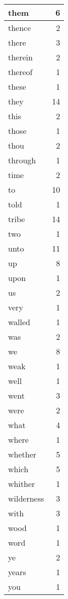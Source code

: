 \begin{center}
\begin{longtable}{l|r}
them & 6\\ \hline 
thence & 2\\ \hline 
there & 3\\ \hline 
therein & 2\\ \hline 
thereof & 1\\ \hline 
these & 1\\ \hline 
they & 14\\ \hline 
this & 2\\ \hline 
those & 1\\ \hline 
thou & 2\\ \hline 
through & 1\\ \hline 
time & 2\\ \hline 
to & 10\\ \hline 
told & 1\\ \hline 
tribe & 14\\ \hline 
two & 1\\ \hline 
unto & 11\\ \hline 
up & 8\\ \hline 
upon & 1\\ \hline 
us & 2\\ \hline 
very & 1\\ \hline 
walled & 1\\ \hline 
was & 2\\ \hline 
we & 8\\ \hline 
weak & 1\\ \hline 
well & 1\\ \hline 
went & 3\\ \hline 
were & 2\\ \hline 
what & 4\\ \hline 
where & 1\\ \hline 
whether & 5\\ \hline 
which & 5\\ \hline 
whither & 1\\ \hline 
wilderness & 3\\ \hline 
with & 3\\ \hline 
wood & 1\\ \hline 
word & 1\\ \hline 
ye & 2\\ \hline 
years & 1\\ \hline 
you & 1\\ \hline 
\end{longtable}
\end{center}





